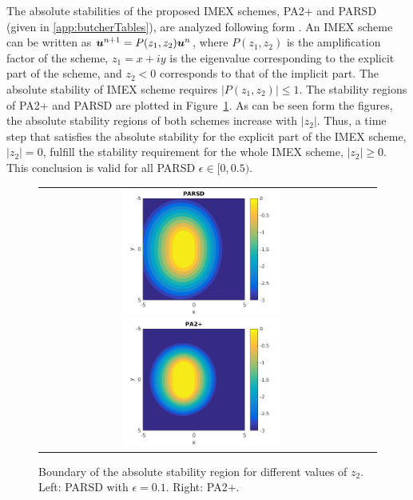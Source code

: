 The absolute stabilities of the proposed IMEX schemes,  PA2+ and PARSD (given in \ref{app:butcherTables}), are analyzed following form \cite{hu_etal_2017}.
An IMEX scheme can be written as $\boldsymbol{u}^{n+1} =P(z_1,z_2)\boldsymbol{u}^{n}$, where $P(z_1,z_2)$ is the amplification factor of the scheme, $z_1 = x +iy$ is the eigenvalue corresponding to the explicit part of the scheme, and $z_2 < 0$ corresponds to that of the implicit part.
The absolute stability of IMEX scheme requires $|P(z_1,z_2)|\leq 1$. 
The stability regions of PA2+ and PARSD are plotted in Figure~\ref{fig:AbsoluteStability}.
As can be seen form the figures, the absolute stability regions of both schemes increase with $|z_2|$.
Thus, a time step that satisfies the absolute stability for the explicit part of the IMEX scheme, $|z_2| = 0$, fulfill the stability requirement for the whole IMEX scheme, $|z_2| \geq 0$. 
This conclusion is valid for all PARSD $\epsilon\in [0,0.5)$.
\begin{figure}[h]
  \centering
  \begin{tabular}{cc}
    \includegraphics[width=0.5\textwidth]{figures/AbsoluteStabilityPARSD}
    \includegraphics[width=0.5\textwidth]{figures/AbsoluteStabilityPA2+}
  \end{tabular}
   \caption{Boundary of the absolute stability region for different values of $z_2$. Left: PARSD with $\epsilon = 0.1$. Right: PA2+.}
  \label{fig:AbsoluteStability}
\end{figure}